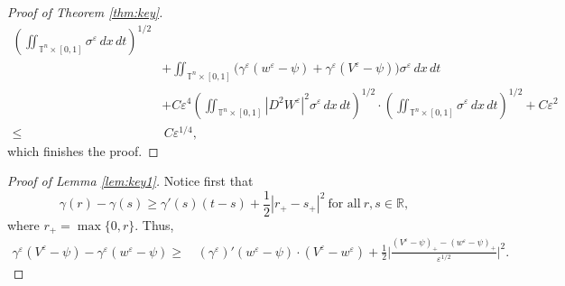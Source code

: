 \documentclass[12pt,reqno]{amsart}
\theoremstyle{plain}
\theoremstyle{remark}
\numberwithin{equation}{section}
\begin{document}
\begin{proof}[Proof of Theorem {\rm\ref{thm:key}}]
\begin{align*}
\left(\iint_{{\mathbb{T}}^n\times[0,1]} {\sigma}^{\varepsilon}\,dx\,dt\right)^{1/2}
\\
&
+
\iint_{{\mathbb{T}}^n\times[0,1]} 
\big({\gamma}^{\varepsilon}(w^{\varepsilon}-\psi)+{\gamma}^{\varepsilon}(V^{\varepsilon}-\psi)\big)
{\sigma}^{\varepsilon}\,dx\,dt\\
&
+C{\varepsilon}^4\left(\iint_{{\mathbb{T}}^n\times[0,1]} 
|D^2W^{\varepsilon}|^2 {\sigma}^{\varepsilon} \,dx\,dt\right)^{1/2}\cdot
\left(\iint_{{\mathbb{T}}^n\times[0,1]} {\sigma}^{\varepsilon}\,dx\,dt\right)^{1/2}
 + C {\varepsilon}^2 \\
\le&\, 
C {\varepsilon}^{1/4}, 
\end{align*}
which finishes the proof. 
\end{proof}

\begin{proof}[Proof of Lemma {\rm\ref{lem:key1}}]
Notice first that 
\[
{\gamma}(r)-{\gamma}(s)\ge{\gamma}'(s)(t-s)+\frac{1}{2}|r_{+}-s_{+}|^2 \ \text{for all} \ r,s\in{\mathbb{R}}, 
\]
where $r_{+}=\max\{0,r\}$. 
Thus, 
\begin{align*}
{\gamma}^{\varepsilon}(V^{\varepsilon}-\psi)-{\gamma}^{\varepsilon}(w^{\varepsilon}-\psi)
\ge&\, 
({\gamma}^{\varepsilon})'(w^{\varepsilon}-\psi)\cdot(V^{\varepsilon}-w^{\varepsilon})
+\frac{1}{2}\Big|\frac{(V^{\varepsilon}-\psi)_{+}-(w^{\varepsilon}-\psi)_{+}}{{\varepsilon}^{1/2}}\Big|^2.
\end{align*}


\end{proof}
\end{document}
